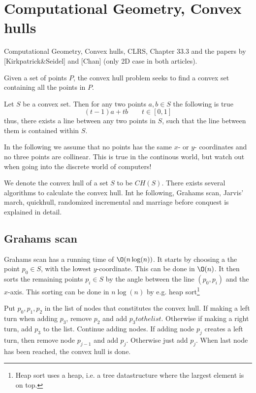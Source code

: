 \documentclass[10pt]{article}
\begin{document}


\clearpage \newpage
\section{Computational Geometry, Convex hulls} %
\label{sec:computational_geometry_convex_hulls}
Computational Geometry, Convex  hulls, CLRS,  Chapter 33.3 and the papers by [Kirkpatrick\&Seidel] and [Chan] (only 2D case in both articles).

Given a set of points $P$, the convex hull problem seeks to find a convex set containing all the points in $P$.

Let $S$ be a convex set. Then for any two points $a,b \in S$ the following is true
\begin{equation}
  (t-1)a+tb \qquad t \in [0,1]
\end{equation}
thus, there exists a line between any two points in $S$, such that the line between them is contained within $S$.

In the following we assume that no points has the same $x$- or $y$- coordinates and no three points are collinear. This is true in the continous world, but watch out when going into the discrete world of computers!

We denote the convex hull of a set $S$ to be $CH(S)$. There exists several algorithms to calculate the convex hull. Int he following, Grahams scan, Jarvis' march, quickhull, randomized incremental and marriage before conquest is explained in detail.

\subsection{Grahams scan} %
\label{sub:grahams_scan}
Grahams scan has a running time of $\O(n\log(n))$. It starts by choosing a the point $p_0 \in S$, with the lowest $y$-coordinate. This can be done in $\O(n)$. It then sorts the remaining points $p_i \in S$ by the angle between the line $(p_0, p_i)$ and the $x$-axis. This sorting can be done in $n \log(n)$ by e.g. heap sort\footnote{Heap sort uses a heap, i.e. a tree datastructure where the largest element is on top.} 

Put $p_0, p_1, p_2$ in the list of nodes that constitutes the convex hull. If making a left turn when adding $p_3$, remove $p_2$ and add $p_3 to the list$. Otherwise if making a right turn, add $p_3$ to the list. Continue adding nodes. If adding node $p_j$ creates a left turn, then remove node $p_{j-1}$ and add $p_j$. Otherwise just add $p_j$. When last node has been reached, the convex hull is done.
\end{document}
